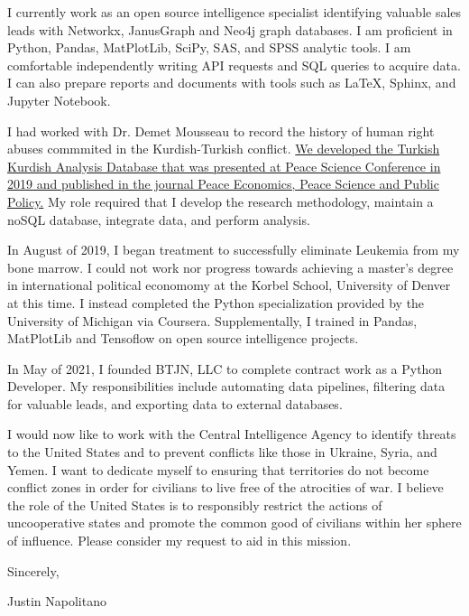 \documentclass[letterpaper,11pt]{article}
\begin{document}
\begin{flushleft}
    \begin{normalsize} 

        I currently work as an open source intelligence specialist identifying valuable sales leads with Networkx, JanusGraph and Neo4j graph databases.  I am proficient in Python, Pandas, MatPlotLib, SciPy, SAS, and SPSS analytic tools.  I am comfortable independently writing API requests and SQL queries to acquire data. I can also prepare reports and documents with tools such as LaTeX, Sphinx, and Jupyter Notebook. 

        I had worked with Dr. Demet Mousseau to record the history of human right abuses commmited in the Kurdish-Turkish conflict. \href{https://doi.org/10.1515/peps-2019-0036}{We developed the Turkish Kurdish Analysis Database that was presented at Peace Science Conference in 2019 and published in the journal Peace Economics, Peace Science and Public Policy.} My role required that I develop the research methodology, maintain a noSQL database, integrate data, and perform analysis.

        In August of 2019, I began treatment to successfully eliminate Leukemia from my bone marrow.  I could not work nor progress towards achieving a master's degree in international political economomy at the Korbel School, University of Denver at this time. I instead completed the Python specialization provided by the University of Michigan via Coursera. Supplementally, I trained in Pandas, MatPlotLib and Tensoflow on open source intelligence projects. 

        In May of 2021, I founded BTJN, LLC to complete contract work as a Python Developer.  My responsibilities include automating data pipelines, filtering data for valuable leads, and exporting data to external databases.   

        I would now like to work with the Central Intelligence Agency to identify threats to the United States and to prevent conflicts like those in Ukraine, Syria, and Yemen. I want to dedicate myself to ensuring that territories do not become conflict zones in order for civilians to live free of the atrocities of war.  I believe the role of the United States is to responsibly restrict the actions of uncooperative states and promote the common good of civilians within her sphere of influence. Please consider my request to aid in this mission.


        \vspace{.15in}

        Sincerely,

        \vspace{.15in}

        Justin Napolitano

    \end{normalsize}
\end{flushleft}
\end{document}
